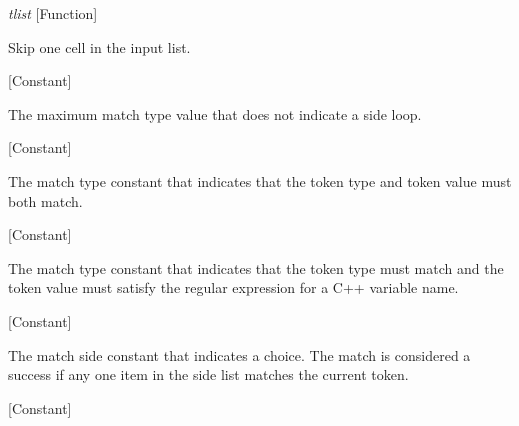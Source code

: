 \vspace{1em}
\noindent
{}
\usebox{\funcname}\emph{tlist}
 \hfill [Function]

\begin{doc-string}
Skip one cell in the input list.
\end{doc-string}

\vspace{1em}
\noindent
{}
\usebox{\funcname}
 \hfill [Constant]

\begin{doc-string}
The maximum match type value that does not indicate a side loop.
\end{doc-string}

\vspace{1em}
\noindent
{}
\usebox{\funcname}
 \hfill [Constant]

\begin{doc-string}
The match type constant that indicates that the token type and token value
must both match.
\end{doc-string}

\vspace{1em}
\noindent
{}
\usebox{\funcname}
 \hfill [Constant]

\begin{doc-string}
The match type constant that indicates that the token type must match and
the token value must satisfy the regular expression for a C++ variable name.
\end{doc-string}

\vspace{1em}
\noindent
{}
\usebox{\funcname}
 \hfill [Constant]

\begin{doc-string}
The match side constant that indicates a choice.  The match is considered a
success if any one item in the side list matches the current token.
\end{doc-string}

\vspace{1em}
\noindent
{}
\usebox{\funcname}
 \hfill [Constant]

